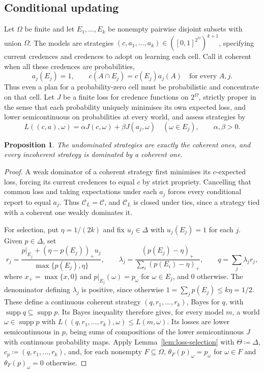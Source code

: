 \documentclass[11pt]{article}
\newtheorem{proposition}[theorem]{Proposition}
\theoremstyle{definition}
\theoremstyle{remark}
\newcommand{\C}{\mathcal C}
\newcommand{\supp}{\operatorname{supp}}
\begin{document}
\subsection{Conditional updating}
Let $\Omega$ be finite and let $E_1,\ldots,E_k$ be nonempty pairwise disjoint subsets with union $\Omega$. The models are strategies $(c,a_1,\ldots,a_k)\in([0,1]^{2^\Omega})^{k+1}$, specifying current credences and credences to adopt on learning each cell. Call it coherent when all these credences are probabilities,
\[
a_j(E_j)=1,\qquad c(A\cap E_j)=c(E_j)a_j(A)\quad\text{for every }A,j.
\]
Thus even a plan for a probability-zero cell must be probabilistic and concentrate on that cell. Let $J$ be a finite loss for credence functions on $2^\Omega$, strictly proper in the sense that each probability uniquely minimises its own expected loss, and lower semicontinuous on probabilities at every world, and assess strategies by
\[
L((c,a),\omega)=\alpha J(c,\omega)+\beta J(a_j,\omega)
\quad(\omega\in E_j),\qquad \alpha,\beta>0.
\]
\begin{proposition}\label{prop:short-updating}
The undominated strategies are exactly the coherent ones, and every incoherent strategy is dominated by a coherent one.
\end{proposition}
\begin{proof}
A weak dominator of a coherent strategy first minimises its $c$-expected loss, forcing its current credences to equal $c$ by strict propriety. Cancelling that common loss and taking expectations under each $a_j$ forces every conditional report to equal $a_j$. {\color{red}Thus $\C_L=\C$, and $\C_L$ is closed under ties, since a strategy tied with a coherent one weakly dominates it.}

For selection, put $\eta=1/(2k)$ and fix $u_j\in\Delta$ with $u_j(E_j)=1$ for each $j$. Given $p\in\Delta$, set
\[
r_j=\frac{p|_{E_j}+(\eta-p(E_j))_+u_j}{\max\{p(E_j),\eta\}},\qquad
\lambda_j=\frac{(p(E_j)-\eta)_+}{\sum_i(p(E_i)-\eta)_+},\qquad
q=\sum_j\lambda_jr_j,
\]
where $x_+=\max\{x,0\}$ and $p|_{E_j}(\omega)=p_\omega$ for $\omega\in E_j$, and $0$ otherwise. The denominator defining $\lambda_j$ is positive, since otherwise $1=\sum_jp(E_j)\le k\eta=1/2$. These define a continuous coherent strategy $(q,r_1,\ldots,r_k)$, Bayes for $q$, with $\supp q\subseteq\supp p$. Its Bayes inequality therefore gives, for every model $m$, a world $\omega\in\supp p$ with $L((q,r_1,\ldots,r_k),\omega)\le L(m,\omega)$. Its losses are lower semicontinuous in $p$, being sums of compositions of the lower semicontinuous $J$ with continuous probability maps. {\color{red}Apply Lemma~\ref{lem:loss-selection} with $\Theta\coloneqq\Delta$, $c_p\coloneqq(q,r_1,\ldots,r_k)$, and, for each nonempty $F\subseteq\Omega$, $\theta_F(p)_\omega=p_\omega$ for $\omega\in F$ and $\theta_F(p)_\omega=0$ otherwise.}
\end{proof}
\end{document}
